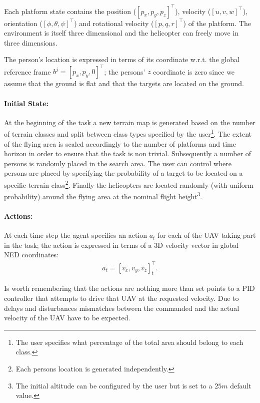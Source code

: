 \documentclass[a4paper,11pt]{report}
\begin{document}
Each platform state contains the position ($[p_x,p_y,p_z]^\intercal$), velocity ($[u,v,w]^\intercal$), orientation ($[\phi,\theta,\psi]^\intercal$) and rotational velocity ($[p,q,r]^\intercal$) of the platform. 
The environment is itself three dimensional and the helicopter can freely move in three dimensions.

The person's location is expressed in terms of its coordinate w.r.t. the global reference frame  $b^j=[p_x,p_y,0]^\intercal$; the persons' $z$ coordinate is zero since we assume that the ground is flat and that the targets are located on the ground.

\paragraph{Initial State:} At the beginning of the task a new terrain map is generated based on the number of terrain classes and split between class types specified by the user\footnote{The user specifies what percentage of the total area should belong to each class.}. 
The extent of the flying area is scaled accordingly to the number of platforms and time horizon in order to ensure that the task is non trivial.
Subsequently a number of persons is randomly placed in the search area. The user can control where persons are placed by specifying the probability of a target to be located on a specific terrain class\footnote{Each persons location is generated independently.}. 
Finally the helicopters are located randomly (with uniform probability) around the flying area at the nominal flight height\footnote{The initial altitude can be configured by the user but is set to a $25m$ default value.}.

\paragraph{Actions:}
At each time step the agent specifies an action $a_t$ for each of the UAV taking part in the task; the action is expressed in terms of a 3D velocity vector in global NED coordinates:
\begin{align}
a_t=[v_x,v_y,v_z]_t^\intercal.
\end{align}

Is worth remembering that the actions are nothing more than set points to a PID controller that attempts to drive that UAV at the requested velocity.
Due to delays and disturbances mismatches between the commanded and the actual velocity of the UAV have to be expected. 
\end{document}
